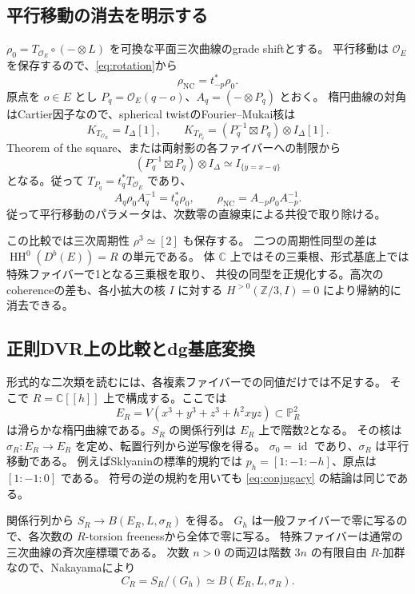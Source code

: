 \documentclass[a4paper,11pt]{ltjsarticle}
\theoremstyle{definition}
\newcommand{\CC}{\mathbb C}
\newcommand{\OO}{\mathcal O}
\newcommand{\PP}{\mathbb P}
\newcommand{\HH}{\operatorname{HH}}
\newcommand{\NC}{\operatorname{NC}}
\newcommand{\id}{\operatorname{id}}
\begin{document}
\subsection{平行移動の消去を明示する}

$\rho_0=T_{\OO_E}\circ(-\otimes L)$ を可換な平面三次曲線のgrade shiftとする。
平行移動は $\OO_E$ を保存するので、\eqref{eq:rotation}から
\[
 \rho_{\NC}=t_{-p}^*\rho_0.
\]
原点を $o\in E$ とし $P_q=\OO_E(q-o)$、$A_q=(-\otimes P_q)$ とおく。
楕円曲線の対角はCartier因子なので、spherical twistのFourier--Mukai核は
\[
 K_{T_{\OO_E}}=I_\Delta[1],\qquad
 K_{T_{P_q}}=(P_q^{-1}\boxtimes P_q)\otimes I_\Delta[1].
\]
Theorem of the square、または両射影の各ファイバーへの制限から
\[
 (P_q^{-1}\boxtimes P_q)\otimes I_\Delta
 \simeq I_{\{y=x-q\}}
\]
となる。従って $T_{P_q}=t_q^*T_{\OO_E}$ であり、
\begin{equation}\label{eq:conjugacy}
 A_q\rho_0A_q^{-1}=t_q^*\rho_0,
 \qquad \rho_{\NC}=A_{-p}\rho_0A_{-p}^{-1}.
\end{equation}
従って平行移動のパラメータは、次数零の直線束による共役で取り除ける。

この比較では三次周期性 $\rho^3\simeq[2]$ も保存する。
二つの周期性同型の差は $\HH^0(D^b(E))=R$ の単元である。
体 $\CC$ 上ではその三乗根、形式基底上では特殊ファイバーで1となる三乗根を取り、
共役の同型を正規化する。高次のcoherenceの差も、各小拡大の核 $I$ に対する
$H^{>0}(\mathbb Z/3,I)=0$ により帰納的に消去できる。

\subsection{正則DVR上の比較とdg基底変換}

形式的な二次類を読むには、各複素ファイバーでの同値だけでは不足する。
そこで $R=\CC[[h]]$ 上で構成する。ここでは
\[
 E_R=V(x^3+y^3+z^3+h^2xyz)\subset\PP^2_R
\]
は滑らかな楕円曲線である。$S_R$ の関係行列は $E_R$ 上で階数2となる。
その核は $\sigma_R:E_R\to E_R$ を定め、転置行列から逆写像を得る。
$\sigma_0=\id$ であり、$\sigma_R$ は平行移動である。
例えばSklyaninの標準的規約では $p_h=[1:-1:-h]$、原点は $[1:-1:0]$ である。
符号の逆の規約を用いても \eqref{eq:conjugacy} の結論は同じである。

関係行列から $S_R\to B(E_R,L,\sigma_R)$ を得る。
$G_h$ は一般ファイバーで零に写るので、各次数の $R$-torsion freenessから全体で零に写る。
特殊ファイバーは通常の三次曲線の斉次座標環である。
次数 $n>0$ の両辺は階数 $3n$ の有限自由 $R$-加群なので、Nakayamaにより
\begin{equation}\label{eq:relative-thcr}
 C_R=S_R/(G_h)\simeq B(E_R,L,\sigma_R).
\end{equation}
\end{document}
